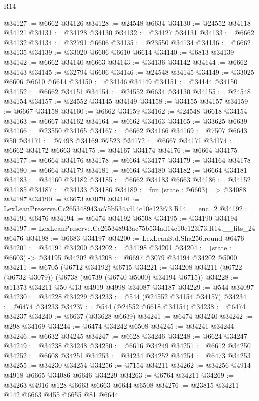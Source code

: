 \begin{lexlean}{R14}
\begin{coremodule}
@34127 := @6662 @34126
@34128 := @24548 @6634
@34130 := @24552 @34118 @34121
@34131 := @34128 @34130
@34132 := @34127 @34131
@34133 := @6662 @34132
@34134 := @32791 @6606
@34135 := @23550 @34134
@34136 := @6662 @34135
@34139 := @33020 @6606 @6610 @6614
@34140 := @6813 @34139
@34142 := @6662 @34140 @6663
@34143 := @34136 @34142
@34144 := @6662 @34143
@34145 := @32794 @6606
@34146 := @24548 @34145
@34149 := @33025 @6606 @6610 @6614
@34150 := @34146 @34149
@34151 := @34144 @34150
@34152 := @6662 @34151
@34154 := @24552 @6634 @34130
@34155 := @24548 @34154
@34157 := @24552 @34145 @34149
@34158 := @34155 @34157
@34159 := @6667 @34158
@34160 := @6662 @34159
@34162 := @24548 @6618 @34154
@34163 := @6667 @34162
@34164 := @6662 @34163
@34165 := @33625 @6639
@34166 := @23550 @34165
@34167 := @6662 @34166
@34169 := @7507 @6643 @50
@34171 := @7498 @34169 @7523
@34172 := @6667 @34171
@34174 := @6662 @34172 @6663
@34175 := @34167 @34174
@34176 := @6664 @34175
@34177 := @6664 @34176
@34178 := @6664 @34177
@34179 := @34164 @34178
@34180 := @6664 @34179
@34181 := @6664 @34180
@34182 := @6664 @34181
@34183 := @34160 @34182
@34185 := @6662 @34183 @6663
@34186 := @34152 @34185
@34187 := @34133 @34186
@34189 := fun (state : @6603) => @34088 @34187
@34190 := @6673 @3079
@34191 := LexLeanPreserve.Cc265348943ac75b534ad14c10e123f73.R14.__enc_2
@34192 := @34191 @6476
@34194 := @6474 @34192 @6508
@34195 := @34190 @34194
@34197 := LexLeanPreserve.Cc265348943ac75b534ad14c10e123f73.R14.__fits_24 @6476
@34198 := @6683 @34197
@34200 := LexLeanStd.Sha256.round @6476
@34201 := @34191 @34200
@34202 := @34198 @34201
@34204 := (state : @6603) -> @34195 @34202
@34208 := @6697 @3079 @34194 @34202 @5000
@34211 := @6705 (@6712 @34192) @6715
@34221 := @34208 @34211 (@6722 (@6732 @3079)) (@6738 (@6739 (@6740 @5000) @34194 @6715))
@34228 := @11373 @34211 @50 @13 @4919 @4998 @34087 @34187
@34229 := @544 @34097
@34230 := @34228 @34229
@34233 := @544 (@24552 @34154 @34157)
@34234 := @6474 @34233
@34237 := @544 (@24552 @6618 @34154)
@34238 := @6474 @34237
@34240 := @6637 (@33628 @6639)
@34241 := @6474 @34240
@34242 := @298 @34169
@34244 := @6474 @34242 @6508
@34245 := @34241 @34244
@34246 := @6632 @34245
@34247 := @6628 @34246
@34248 := @6624 @34247
@34249 := @34238 @34248
@34250 := @6616 @34249
@34251 := @6612 @34250
@34252 := @6608 @34251
@34253 := @34234 @34252
@34254 := @6473 @34253
@34255 := @34230 @34254
@34256 := @7154 @34211
@34262 := @34256 @4914 @4918 @6665 @34086 @6646 @34229
@34263 := @6764 @34211
@34269 := @34263 @4916 @128 @6663 @6663 @6644 @6508
@34276 := @23815 @34211 @142 @6663 @455 @6655 @81 @6644

\end{coremodule}
\end{lexlean}
